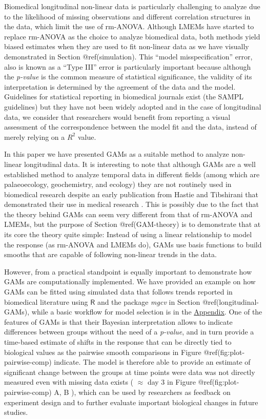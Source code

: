 \documentclass[Royal,times,sagev]{sagej}
\begin{document}
Biomedical longitudinal non-linear data is particularly challenging to
analyze due to the likelihood of missing observations and different
correlation structures in the data, which limit the use of rm-ANOVA.
Although LMEMs have started to replace rm-ANOVA as the choice to analyze
biomedical data, both methods yield biased estimates when they are used
to fit non-linear data as we have visually demonstrated in Section
@ref(simulation). This ``model misspecification'' error, also is known
as a ``Type III'' error \citep{dennis2019} is particularly important
because although the \emph{p-value} is the common measure of statistical
significance, the validity of its interpretation is determined by the
agreement of the data and the model. Guidelines for statistical
reporting in biomedical journals exist (the SAMPL guidelines)
\citep{lang2015} but they have not been widely adopted and in the case
of longitudinal data, we consider that researchers would benefit from
reporting a visual assessment of the correspondence between the model
fit and the data, instead of merely relying on a \(R^2\) value.

In this paper we have presented GAMs as a suitable method to analyze
non-linear longitudinal data. It is interesting to note that although
GAMs are a well established method to analyze temporal data in different
fields (among which are palaeoecology, geochemistry, and ecology)
\citep{hefley2017, pedersen2019} they are not routinely used in
biomedical research despite an early publication from Hastie and
Tibshirani that demonstrated their use in medical research
\citep{hastie1995}. This is possibly due to the fact that the theory
behind GAMs can seem very different from that of rm-ANOVA and LMEMs, but
the purpose of Section @ref(GAM-theory) is to demonstrate that at its
core the theory quite simple: Instead of using a linear relationship to
model the response (as rm-ANOVA and LMEMs do), GAMs use basis functions
to build smooths that are capable of following non-linear trends in the
data.

However, from a practical standpoint is equally important to demonstrate
how GAMs are computationally implemented. We have provided an example on
how GAMs can be fitted using simulated data that follows trends reported
in biomedical literature \citep{vishwanath2009} using \(\textsf{R}\) and
the package \emph{mgcv}\citep{wood2017} in Section
@ref(longitudinal-GAMs), while a basic workflow for model selection is
in the \protect\hyperlink{workflow}{Appendix}. One of the features of
GAMs is that their Bayesian interpretation allows to indicate
differences between groups without the need of a \emph{p-value}, and in
turn provide a time-based estimate of shifts in the response that can be
directly tied to biological values as the pairwise smooth comparisons in
Figure @ref(fig:plot-pairwise-comp) indicate. The model is therefore
able to provide an estimate of significant change between the groups at
time points were data was not directly measured even with missing data
exists ( \(\approx\) day 3 in Figure @ref(fig:plot-pairwise-comp) A, B
), which can be used by researchers as feedback on experiment design and
to further evaluate important biological changes in future studies.
\end{document}
